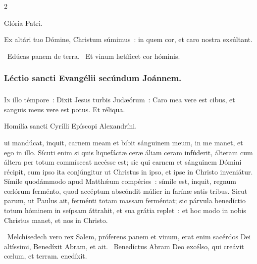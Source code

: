 \documentclass[9pt,twoside]{extarticle}
\begin{document}
\begin{multicols}{2}
{Glória Patri.

\begin{tightlist}{}
\item {} Ex altári tuo Dómine, Christum súmimus~: in quem cor, et caro nostra exsúltant.
\item {}~Edúcas panem de terra. ~Et vinum lætíficet cor hóminis.
\end{tightlist}

\subsubsection*{\center Léctio sancti Evangélii secúndum Joánnem.}
\subsubsection*{\center {}}
\lettrine{I}n illo témpore~: Dixit Jesus turbis Judæórum~: Caro mea vere est cibus, et sanguis meus vere est potus. Et réliqua.

\begin{center}Homilía sancti Cyrílli Epíscopi Alexandríni.\\
 \end{center}
ui mandúcat, inquit, carnem meam et bibit sánguinem meum, in me manet, et ego in illo. Sícuti enim si quis liquefáctæ ceræ áliam ceram infúderit, álteram cum áltera per totum commísceat necésse est; sic qui carnem et sánguinem Dómini récipit, cum ipso ita conjúngitur ut Christus in ipso, et ipse in Christo inveniátur. Símile quodámmodo apud Matthǽum compéries~: símile est, inquit, regnum cœlórum ferménto, quod accéptum abscóndit múlier in farínæ satis tribus. Sicut parum, ut Paulus ait, ferménti totam massam ferméntat; sic párvula benedíctio totum hóminem in seípsam áttrahit, et sua grátia replet~: et hoc modo in nobis Christus manet, et nos in Christo.

\begin{tightlist}{}
\item {}~Melchísedech vero rex Salem, próferens panem et vinum, erat enim sacérdos Dei altíssimi, \textred{*} Benedíxit Abram, et ait. ~Benedíctus Abram Deo excélso, qui creávit cœlum, et terram. enedíxit.
\end{tightlist}

}
\end{multicols}
\end{document}

